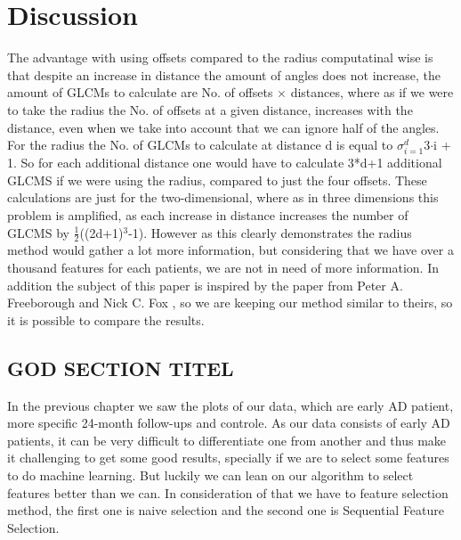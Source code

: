 \chapter{Discussion}
%


The advantage with using offsets compared to the radius computatinal wise is that despite an increase in distance the amount of angles does not increase, the amount of GLCMs to calculate are No. of offsets $\times$ distances, where as if we were to take the radius the No. of offsets at a given distance, increases with the distance, even when we take into account that we can ignore half of the angles. For  the radius the No. of GLCMs to calculate at distance d is equal to $\sigma_{i=1}^d$3$\cdot$i + 1. So for each additional distance one would have to calculate 3*d+1 additional GLCMS if we were using the radius, compared to just the four offsets. These calculations are just for the two-dimensional, where as in three dimensions this problem is amplified, as each increase in distance increases the number of GLCMS by $\frac{1}{2}$((2d+1)$^3$-1). However as this clearly demonstrates the radius method would gather a lot more information, but considering that we have over a thousand features for each patients, we are not in need of more information. In addition the subject of this paper is inspired by the paper from Peter A. Freeborough and Nick C. Fox \cite{MRfreeborough}, so we are keeping our method similar to theirs, so it  is possible to compare the results.

\section{GOD SECTION TITEL}
In the previous chapter we saw the plots of our data, which are early AD patient, more specific 24-month follow-ups and controle. As our data consists of early AD patients, it can be very difficult to differentiate one from another and thus make it challenging to get some good results, specially if we are to select some features to do machine learning. But luckily we can lean on our algorithm to select features better than we can. In consideration of that we have to feature selection method, the first one is naive selection and the second one is Sequential Feature Selection.

